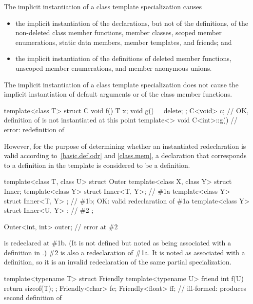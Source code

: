 \pnum
The implicit instantiation of a class template specialization causes
\begin{itemize}
\item
  the implicit instantiation of the declarations, but not of the definitions,
  of the non-deleted
  class member functions,
  member classes,
  scoped member enumerations,
  static data members,
  member templates, and
  friends; and
\item
  the implicit instantiation of the definitions of
  deleted member functions,
  unscoped member enumerations, and
  member anonymous unions.
\end{itemize}
The implicit instantiation of a class template specialization
does not cause the implicit instantiation of
default arguments or 
of the class member functions.
\begin{example}
\begin{codeblock}
template<class T>
struct C {
  void f() { T x; }
  void g() = delete;
};
C<void> c;                       // OK, definition of  is not instantiated at this point
template<> void C<int>::g() { }  // error: redefinition of 
\end{codeblock}
\end{example}
However, for the purpose of determining whether an instantiated redeclaration
is valid according to~\ref{basic.def.odr} and \ref{class.mem},
a declaration that corresponds to a definition in the template
is considered to be a definition.
\begin{example}
\begin{codeblock}
template<class T, class U>
struct Outer {
  template<class X, class Y> struct Inner;
  template<class Y> struct Inner<T, Y>;         // \#1a
  template<class Y> struct Inner<T, Y> { };     // \#1b; OK: valid redeclaration of \#1a
  template<class Y> struct Inner<U, Y> { };     // \#2
};

Outer<int, int> outer;                          // error at \#2
\end{codeblock}

 is redeclared at \#1b. (It is not defined
but noted as being associated with a definition in .) \#2
is also a redeclaration of \#1a. It is noted as associated with a definition,
so it is an invalid redeclaration of the same partial specialization.

\begin{codeblock}
template<typename T> struct Friendly {
  template<typename U> friend int f(U) { return sizeof(T); }
};
Friendly<char> fc;
Friendly<float> ff;                             // ill-formed: produces second definition of 
\end{codeblock}
\end{example}


